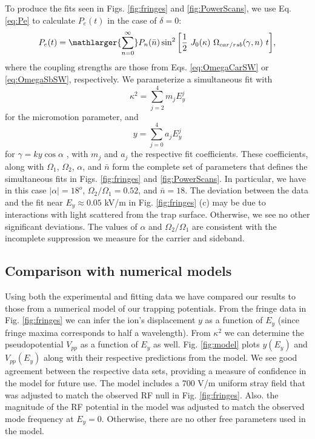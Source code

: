 To produce the fits seen in Figs. \ref{fig:fringes} and \ref{fig:PowerScans}, we use Eq. \ref{eq:Pe} to calculate $P_e(t)$ in the case of $\delta = 0$:
\begin{equation}
P_e(t) = \mathlarger{\sum_{n=0}^{\infty}} P_n (\bar{n}) \sin^2 \bigg[ \frac{1}{2} \ J_0(\kappa) \ \Omega_{car/rsb}(\gamma, n) \ t \bigg] \text{,}
\end{equation}
where the coupling strengths are those from Eqs. \ref{eq:OmegaCarSW} or \ref{eq:OmegaSbSW}, respectively. We parameterize a simultaneous fit with 
\begin{equation}
\kappa^2 = \sum_{j=2}^{4} m_j E_y^j
\end{equation}
for the micromotion parameter, and 
\begin{equation}
y = \sum_{j=0}^{4} a_j E_y^j
\end{equation}
for $\gamma = k y \cos \alpha$ , with $m_j$ and $a_j$ the respective fit coefficients. These coefficients, along with $\Omega_1$, $\Omega_2$, $\alpha$, and $\bar{n}$ form the complete set of parameters that defines the simultaneous fits in Figs. \ref{fig:fringes} and \ref{fig:PowerScans}. In particular, we have in this case $|\alpha| = 18^o$, $\Omega_2 / \Omega_1 = 0.52$, and $\bar{n} = 18$. The deviation between the data and the fit near $E_y \approx 0.05$ kV/m in Fig. \ref{fig:fringes} (c) may be due to interactions with light scattered from the trap surface. Otherwise, we see no other significant deviations. The values of $\alpha$ and $\Omega_2 / \Omega_1$ are consistent with the incomplete suppression we measure for the carrier and sideband. 



\subsection{Comparison with numerical models}

Using both the experimental and fitting data we have compared our results to those from a numerical model of our trapping potentials. From the fringe data in Fig. \ref{fig:fringes} we can infer the ion's displacement $y$ as a function of $E_y$ (since fringe maxima corresponds to half a wavelength). From $\kappa^2$ we can determine the pseudopotential $V_{pp}$ as a function of $E_y$ as well. Fig. \ref{fig:model} plots $y(E_y)$ and $V_{pp}(E_y)$ along with their respective predictions from the model. We see good agreement between the respective data sets, providing a measure of confidence in the model for future use. The model includes a 700 V/m uniform stray field that was adjusted to match the observed RF null in Fig. \ref{fig:fringes}. Also. the magnitude of the RF potential in the model was adjusted to match the observed mode frequency at $E_y = 0$. Otherwise, there are no other free parameters used in the model. 

